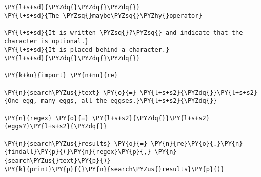 

\section*{}

\begin{Verbatim}[commandchars=\\\{\}]
\PY{l+s+sd}{\PYZdq{}\PYZdq{}\PYZdq{}}
\PY{l+s+sd}{The \PYZsq{}maybe\PYZsq{}\PYZhy{}operator}

\PY{l+s+sd}{It is written \PYZsq{}?\PYZsq{} and indicate that the character is optional.}
\PY{l+s+sd}{It is placed behind a character.}
\PY{l+s+sd}{\PYZdq{}\PYZdq{}\PYZdq{}}

\PY{k+kn}{import} \PY{n+nn}{re}

\PY{n}{search\PYZus{}text} \PY{o}{=} \PY{l+s+s2}{\PYZdq{}}\PY{l+s+s2}{One egg, many eggs, all the eggses.}\PY{l+s+s2}{\PYZdq{}}

\PY{n}{regex} \PY{o}{=} \PY{l+s+s2}{\PYZdq{}}\PY{l+s+s2}{eggs?}\PY{l+s+s2}{\PYZdq{}}

\PY{n}{search\PYZus{}results} \PY{o}{=} \PY{n}{re}\PY{o}{.}\PY{n}{findall}\PY{p}{(}\PY{n}{regex}\PY{p}{,} \PY{n}{search\PYZus{}text}\PY{p}{)}
\PY{k}{print}\PY{p}{(}\PY{n}{search\PYZus{}results}\PY{p}{)}
\end{Verbatim}

